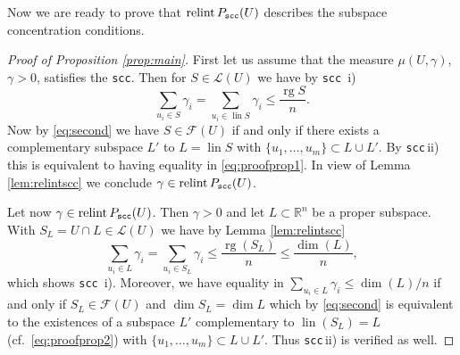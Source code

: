 \documentclass[11pt, a4paper, twoside, reqno]{amsart}
\DeclareMathOperator*{\lin}{lin}
\DeclareMathOperator*{\rg}{rg}
\newcommand{\R}{\mathbb{R}}
\theoremstyle{definition}
\theoremstyle{remark}
\newcommand{\scc}{{\tt scc}}
\DeclareMathOperator{\relint}{relint}
\numberwithin{equation}{section}
\begin{document}
Now we are ready to prove that $\relint P_\scc(U)$ describes the subspace
concentration conditions.
\begin{proof}[Proof of Proposition \ref{prop:main}]
First let us assume that the measure  $\mu(U,\gamma)$, $\gamma>0$,
satisfies the \scc. Then for
$S\in\mathcal{L}(U)$ we have by \scc\, i)
\begin{equation}
  \sum_{u_i\in S} \gamma_i =  \sum_{u_i\in \lin S}\gamma_i\leq
  \frac{\rg S}{n}.
\label{eq:proofprop1}
\end{equation}
Now by \eqref{eq:second} we have $S\in \mathcal{F}(U)$ if and only if
there exists a complementary subspace $L'$ to $L=\lin S$ with
$\{u_1,\dots,u_m\}\subset L\cup L'$. By \scc\,ii) this is equivalent to
having equality in \eqref{eq:proofprop1}.
In view of Lemma \ref{lem:relintscc} we conclude $\gamma\in\relint  P_{\scc}(U)$.

Let now $\gamma\in\relint  P_{\scc}(U)$. Then $\gamma>0$ and let
$L\subset\R^n$ be a proper subspace. With $S_L=U\cap L\in
\mathcal{L}(U)$ we have by Lemma \ref{lem:relintscc}
\begin{equation}
  \sum_{u_i\in L} \gamma_i=  \sum_{u_i\in S_L} \gamma _i\leq
  \frac{\rg (S_L)}{n} \leq \frac{\dim(L)}{n},
\label{eq:proofprop2}
\end{equation}
which shows \scc\, i). Moreover, we have equality in $\sum_{u_i\in L}
\gamma_i\leq \dim(L)/n$  if and only if
$S_L\in\mathcal{F}(U)$ and $\dim S_L=\dim L$  which by \eqref{eq:second} is equivalent to
the existences of a subspace $L'$ complementary to $\lin(S_L)=L$ (cf.~\eqref{eq:proofprop2}) with   $\{u_1,\dots,u_m\}\subset L\cup L'$. Thus \scc\,ii) is
verified as well.
\end{proof}
\end{document}
